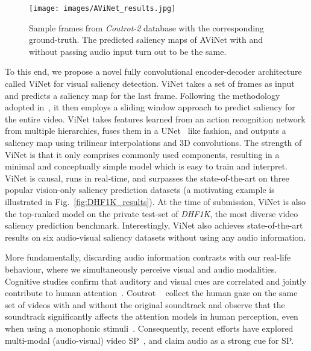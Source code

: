 \documentclass[letterpaper, 10 pt, conference]{ieeeconf}  \usepackage{times}
\begin{document}
\begin{figure*}[t]
\centering
\texttt{[image: images/AViNet\_results.jpg]}
\caption{{Sample frames from \emph{Coutrot-2} database with the corresponding ground-truth. The predicted saliency maps of AViNet with and without passing audio input turn out to be the same.}}\vspace{-.1cm}
\label{fig:avinet_results}
\end{figure*}

To this end, we propose a novel fully convolutional encoder-decoder architecture called ViNet for visual saliency detection. ViNet takes a set of frames as input and predicts a saliency map for the last frame. Following the methodology adopted in~\cite{min2019tased}, it then employs a sliding window approach to predict saliency for the entire video. ViNet takes features learned from an action recognition network from multiple hierarchies, fuses them in a UNet~\cite{ronneberger2015u} like fashion, and outputs a saliency map using trilinear interpolations and 3D convolutions. The strength of ViNet is that it only comprises commonly used components, resulting in a minimal and conceptually simple model which is easy to train and interpret. ViNet is causal, runs in real-time, and surpasses the state-of-the-art on three popular vision-only saliency prediction datasets (a motivating example is illustrated in Fig.~\ref{fig:DHF1K_results}). At the time of submission, ViNet is also the top-ranked model on the private test-set of \emph{DHF1K}, the most diverse video saliency prediction benchmark. Interestingly, ViNet also achieves state-of-the-art results on six audio-visual saliency datasets without using any audio information. 


More fundamentally, discarding audio information contrasts with our real-life behaviour, where we simultaneously perceive visual and audio modalities. Cognitive studies confirm that auditory and visual cues are correlated and jointly contribute to human attention~\cite{van2008audiovisual}. Coutrot \etal ~\cite{coutrot2012influence} collect the human gaze on the same set of videos with and without the original soundtrack and observe that the soundtrack significantly affects the attention models in human perception, even when using a monophonic stimuli~\cite{coutrot2012influence}. Consequently, recent efforts have explored multi-modal (audio-visual) video SP~\cite{tavakoli2019dave,tsiami2020stavis}, and claim audio as a strong  cue for SP. 
\end{document}
